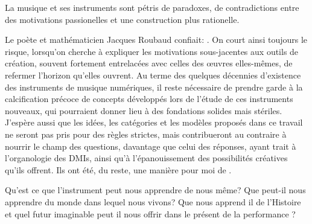 

La musique et ses instruments sont pétris de paradoxes, de contradictions entre des motivations passionelles et une construction plus rationelle.


\noindent Le poète et mathématicien Jacques Roubaud confiait: . On court ainsi toujours le risque, lorsqu'on cherche à expliquer les motivations sous-jacentes aux outils de création, souvent fortement entrelacées avec celles des œuvres elles-mêmes, de refermer l'horizon qu'elles ouvrent. 
Au terme des quelques décennies d'existence des instruments de musique numériques, il reste nécessaire de prendre garde à la calcification précoce de concepts développés lors de l'étude de ces instruments nouveaux, qui pourraient donner lieu à des fondations solides mais stériles. J'espère aussi que les idées, les catégories et les modèles proposés dans ce travail ne seront pas pris pour des règles strictes, mais contribueront au contraire à nourrir le champ des questions, davantage que celui des réponses, ayant trait à l'organologie des \glspl{DMI}, ainsi qu'à l'épanouissement des possibilités créatives qu'ils offrent. Ils ont été, du reste, une manière pour moi de .


Qu'est ce que l'instrument peut nous apprendre de nous même? Que peut-il nous apprendre du monde dans lequel nous vivons? Que nous apprend il de l'Histoire et quel futur imaginable peut il nous offrir dans le présent de la performance ?


